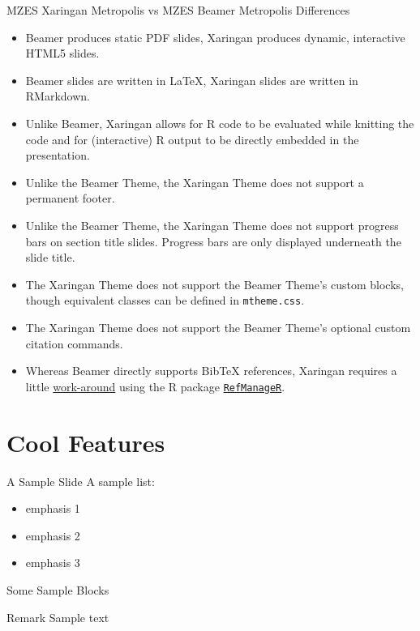 \documentclass[10pt, aspectratio=169]{beamer}
\newcommand{\cemph}[1]{\textcolor{mzescyan}{#1}}
\begin{document}
{		\begin{frame}{MZES Xaringan Metropolis vs MZES Beamer Metropolis}
	\small
	\cemph{Differences}
		\begin{itemize}
			\item Beamer produces static PDF slides, Xaringan produces dynamic, interactive HTML5 slides.
			\item Beamer slides are written in LaTeX, Xaringan slides are written in RMarkdown.
			\item Unlike Beamer, Xaringan allows for R code to be evaluated while knitting the code and for (interactive) R output to be directly embedded in the presentation.
			\item Unlike the Beamer Theme, the Xaringan Theme does not support a permanent footer.
			\item Unlike the Beamer Theme, the Xaringan Theme does not support progress bars on section title slides. Progress bars are only displayed underneath the slide title.
			\item The Xaringan Theme does not support the Beamer Theme's custom blocks, though equivalent classes can be defined in \texttt{mtheme.css}.
			\item The Xaringan Theme does not support the Beamer Theme's optional custom citation commands.
			\item Whereas Beamer directly supports BibTeX references, Xaringan requires a little \href{https://github.com/yihui/xaringan/wiki/Bibliography-and-citations}{work-around} using the R package \href{https://cran.r-project.org/web/packages/RefManageR/index.html}{\texttt{RefManageR}}.
		\end{itemize}
	\end{frame}
	
	\section{Cool Features}
	\begin{frame}{A Sample Slide}
		A sample list:
		\begin{itemize}
			\item \textcolor{mzesgold}{emphasis 1}
			\item \textcolor{mzescyan}{emphasis 2}
			\item \textcolor{mzesdarkgold}{emphasis 3}
		\end{itemize}
	\end{frame}
	
	\begin{frame}{Some Sample Blocks}
		\begin{block}{Remark}
			Sample text
		\end{block}
		

\end{frame}}
\end{document}
